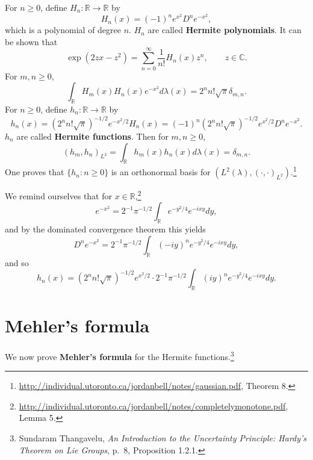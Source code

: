 \documentclass{article}
\theoremstyle{definition}
\begin{document}
For $n \geq 0$, define $H_n:\mathbb{R} \to \mathbb{R}$ by
\[
H_n(x) = (-1)^n e^{x^2} D^n e^{-x^2},
\]
which is a polynomial of degree $n$. $H_n$ are called \textbf{Hermite
polynomials}.
It can be shown that
\begin{equation}
\exp(2zx-z^2)=\sum_{n=0}^\infty \frac{1}{n!} H_n(x) z^n,\qquad z \in \mathbb{C}.
\label{generating}
\end{equation}
For $m, n \geq 0$,
\[
\int_{\mathbb{R}} H_m(x) H_n(x) e^{-x^2} d\lambda(x) =2^n n! \sqrt{\pi}   \delta_{m,n}.
\]
For $n \geq 0$, define  $h_n:\mathbb{R} \to \mathbb{R}$ by
\[
h_n(x) = 
(2^n n! \sqrt{\pi})^{-1/2} e^{-x^2/2}H_n(x)=
(-1)^n (2^n n! \sqrt{\pi})^{-1/2} e^{x^2/2} D^n e^{-x^2}.
\]
$h_n$ are called \textbf{Hermite functions}.
Then for $m,n \geq 0$,
\[
(h_m,h_n)_{L^2} = \int_{\mathbb{R}} h_m(x) h_n(x) d\lambda(x) = \delta_{m,n}.
\]
One proves that $\{h_n: n \geq 0\}$ is an orthonormal basis for $(L^2(\lambda),(\cdot,\cdot)_{L^2})$.\footnote{\url{http://individual.utoronto.ca/jordanbell/notes/gaussian.pdf},
Theorem 8.}


We remind ourselves that for $x \in \mathbb{R}$,\footnote{\url{http://individual.utoronto.ca/jordanbell/notes/completelymonotone.pdf},
Lemma 5.}
\[
e^{-x^2} = 2^{-1} \pi^{-1/2} \int_{\mathbb{R}} e^{-y^2/4} e^{-i xy} dy,
\]
and by the dominated convergence theorem this yields
\[
D^n e^{-x^2} = 2^{-1} \pi^{-1/2} \int_{\mathbb{R}} (-iy)^n e^{-y^2/4} e^{-ixy} dy,
\]
and so
\begin{equation}
h_n(x) = (2^n n! \sqrt{\pi})^{-1/2} e^{x^2/2} \cdot  2^{-1} \pi^{-1/2}  \int_{\mathbb{R}} (iy)^n e^{-y^2/4} e^{-ixy} dy.
\label{gaussian}
\end{equation}


\section{Mehler's formula}
We now prove \textbf{Mehler's formula} for the Hermite functions.\footnote{Sundaram Thangavelu,
{\em An Introduction to the
Uncertainty Principle: Hardy's Theorem on Lie Groups}, p.~8, Proposition 1.2.1.}
\end{document}
